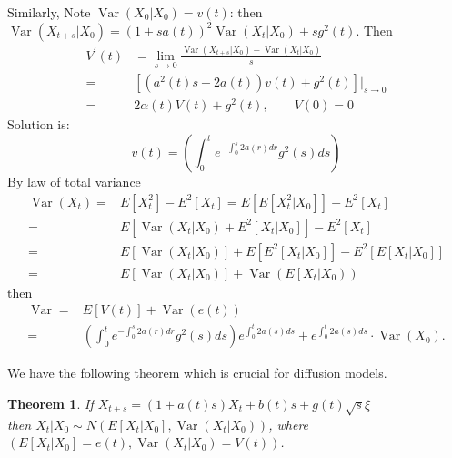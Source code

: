 \documentclass{ctexart}
\newtheorem{theorem}{Theorem}
\begin{document}
Similarly, Note $\operatorname{Var}\left(X_{0} | X_{0}\right)=v(t)$:
then $\operatorname{Var}\left(X_{t+s} | X_{0}\right)=(1+s a(t))^{2} \operatorname{Var}\left(X_{t} | X_{0}\right)+s g^{2}(t)$. Then
\begin{equation}
    \begin{aligned}
        V^{\prime}(t)&=\lim _{s \rightarrow 0} \frac{\operatorname{Var}\left(X_{t+s} | X_{0}\right)-\operatorname{Var}\left(X_{t} | X_{0}\right)}{s}\\
        =&\left[\left(a^{2}(t) s+2 a(t)\right) v(t)+g^{2}(t)\right]|_{s \rightarrow 0}\\ 
        =&2 \alpha(t) V(t)+g^{2}(t), \qquad V(0)=0
    \end{aligned}
\end{equation}
Solution is:
\begin{equation}
    v(t)=\left(\int_{0}^{t} e^{-\int_{0}^{s} 2 a(r) d r} g^{2}(s) d s\right)
\end{equation}
By law of total variance
\begin{equation}
    \begin{aligned}
        \operatorname{Var}\left(X_{t}\right)=&E\left[X_{t}^{2}\right]-E^{2}\left[X_{t}\right]=E\left[ E\left[X_{t}^{2} | X_{0}\right]\right]-E^{2}\left[X_{t}\right] \\
        =&E\left[\operatorname{Var}\left(X_{t} | X_{0}\right)+E^{2}\left[X_{t} | X_{0}\right]\right]-E^{2}\left[X_{t}\right] \\
        =&E\left[\operatorname{Var}\left(X_{t} | X_{0}\right)\right]+E\left[E^{2}\left[X_{t} | X_0\right]\right]-E^{2}\left[E\left[X_{t} | X_{0}\right]\right]\\
        =&E\left[\operatorname{Var}\left(X_{t} | X_{0}\right)\right]+\operatorname{Var}\left(E\left[X_{t} | X_0\right)\right)
    \end{aligned}
\end{equation}
then 
\begin{equation}
    \begin{aligned}
        \operatorname{Var}=&E[V(t)]+\operatorname{Var}(e(t))\\
        =&\left(\int_{0}^{t} e^{-\int_{0}^{s} 2 a(r) d r} g^{2}(s) d s\right) e^{\int_{0}^{t} 2 a(s) d s}+e^{\int_{0}^{t} 2 a(s) d s} \cdot \operatorname{Var}\left(X_{0}\right) .
    \end{aligned}
\end{equation}

We have the following theorem which is crucial for diffusion models.
\begin{theorem}\label{thm1}
    If  $X_{t+s}=(1+a(t) s) X_{t}+b(t) s+g(t) \sqrt{s} \xi$\\
    then $X_{t} | X_{0} \sim N\left(E\left[X_{t} | X_{0}\right], \operatorname{Var}\left(X_{t} | X_{0}\right)\right)$, 
    where $\left(E\left[X_{t} | X_{0}\right]=e(t), \operatorname{Var}\left(X_{t} | X_{0}\right)=V(t)\right)$.        
\end{theorem}
\end{document}
